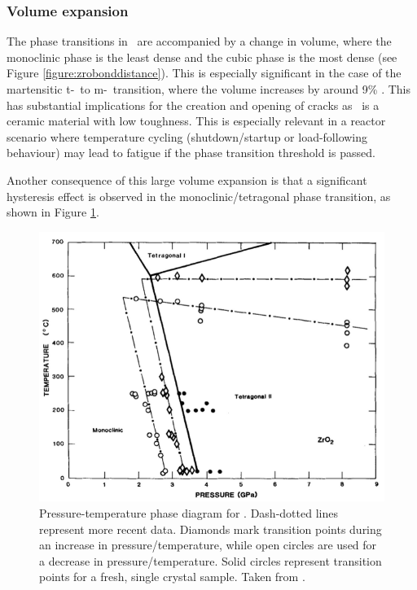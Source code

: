 \subsubsection*{Volume expansion}

The phase transitions in \zirconia\ are accompanied by a change in volume, where the monoclinic phase is the least dense and the cubic phase is the most dense (see Figure \ref{figure:zrobonddistance}). This is especially significant in the case of the martensitic t-\zirconia\ to m-\zirconia\ transition, where the volume increases by around 9\% \cite{Gupta1977}. This has substantial implications for the creation and opening of cracks as \zirconia\ is a ceramic material with low toughness. This is especially relevant in a reactor scenario where temperature cycling (shutdown/startup or load-following behaviour) may lead to fatigue if the phase transition threshold is passed.

Another consequence of this large volume expansion is that a significant hysteresis effect is observed in the monoclinic/tetragonal phase transition, as shown in Figure \ref{fig:phasediagram}. 

\begin{figure}[htp]
  \centering
      \includegraphics[width=14cm]{images/zirconiaphasediagram.png}
  \caption[Pressure-temperature phase diagram for \zirconia . Dash-dotted lines represent more recent data. Diamonds mark transition points during an increase in pressure/temperature, while open circles are used for a decrease in pressure/temperature. Solid circles represent transition points for a fresh, single crystal sample.]{Pressure-temperature phase diagram for \zirconia . Dash-dotted lines represent more recent data. Diamonds mark transition points during an increase in pressure/temperature, while open circles are used for a decrease in pressure/temperature. Solid circles represent transition points for a fresh, single crystal sample. Taken from \cite{gando2011partial}. \label{fig:phasediagram}}
\end{figure}

